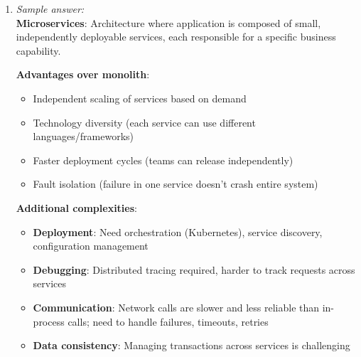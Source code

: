 \documentclass[11pt]{article}
\begin{document}
\begin{enumerate}[label=\textbf{\arabic*.}]
  \textbf{Trade-offs}:
  \begin{itemize}
    \item \textbf{Strong consistency}: All reads see the latest write. Requires coordination (locks, 
    consensus), reducing availability and increasing latency
    \item \textbf{Eventual consistency}: Higher availability and performance, but complexity in 
    handling conflicts and stale reads
  \end{itemize}

  \textbf{Choose eventual consistency when}:
  \begin{itemize}
    \item Availability is critical (e.g., social media feeds, shopping carts)
    \item Temporary staleness is acceptable
    \item System must tolerate network partitions
    \item Examples: DynamoDB, Cassandra, DNS
  \end{itemize}

  \item \emph{Sample answer:}\\
  \textbf{Microservices}: Architecture where application is composed of small, independently 
  deployable services, each responsible for a specific business capability.

  \textbf{Advantages over monolith}:
  \begin{itemize}
    \item Independent scaling of services based on demand
    \item Technology diversity (each service can use different languages/frameworks)
    \item Faster deployment cycles (teams can release independently)
    \item Fault isolation (failure in one service doesn't crash entire system)
  \end{itemize}

  \textbf{Additional complexities}:
  \begin{itemize}
    \item \textbf{Deployment}: Need orchestration (Kubernetes), service discovery, configuration management
    \item \textbf{Debugging}: Distributed tracing required, harder to track requests across services
    \item \textbf{Communication}: Network calls are slower and less reliable than in-process calls; 
    need to handle failures, timeouts, retries
    \item \textbf{Data consistency}: Managing transactions across services is challenging
  \end{itemize}


\end{enumerate}
\end{document}
